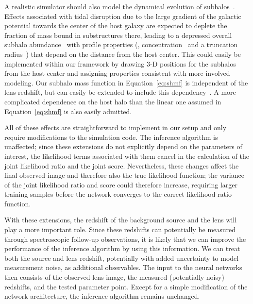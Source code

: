 \documentclass[twocolumn]{aastex63}
\begin{document}
A realistic simulator should also model the dynamical evolution of subhalos~\citep{2017MNRAS.469.1997D}. Effects associated with tidal disruption due to the large gradient of the galactic potential towards the center of the host galaxy are expected to deplete the fraction of mass bound in substructures there, leading to a depressed overall subhalo abundance~\citep{2016MNRAS.457.1208H} with profile properties (\eg, concentration~\citep{1603.04057} and a truncation radius~\citep{0705.0682}) that depend on the distance from the host center. This could easily be implemented within our framework by drawing 3-D positions for the subhalos from the host center and assigning properties consistent with more involved modeling. Our subhalo mass function in Equation~\eqref{eq:shmf} is independent of the lens redshift, but can easily be extended to include this dependency~\citep{2017MNRAS.469.1997D,2018PhRvD..97l3002H}. A more complicated dependence on the host halo than the linear one assumed in Equation~\eqref{eq:shmf} is also easily admitted.

All of these effects are straightforward to implement in our setup and only require modifications to the simulation code. The inference algorithm is unaffected; since these extensions do not explicitly depend on the parameters of interest, the likelihood terms associated with them cancel in the calculation of the joint likelihood ratio and the joint score. Nevertheless, these changes affect the final observed image and therefore also the true likelihood function; the variance of the joint likelihood ratio and score could therefore increase, requiring larger training samples before the network converges to the correct likelihood ratio function.

With these extensions, the redshift of the background source and the lens will play a more important role. Since these redshifts can potentially be measured through spectroscopic follow-up observations, it is likely that we can improve the performance of the inference algorithm by using this information. We can treat both the source and lens redshift, potentially with added uncertainty to model measurement noise, as additional observables. The input to the neural networks then consists of the observed lens image, the measured (potentially noisy) redshifts, and the tested parameter point. Except for a simple modification of the network architecture, the inference algorithm remains unchanged.
\end{document}

